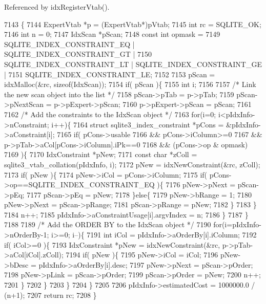 Referenced by idx\+Register\+Vtab().


\begin{DoxyCode}
7143                                                                              \{
7144   ExpertVtab *p = (ExpertVtab*)pVtab;
7145   \textcolor{keywordtype}{int} rc = SQLITE_OK;
7146   \textcolor{keywordtype}{int} n = 0;
7147   IdxScan *pScan;
7148   \textcolor{keyword}{const} \textcolor{keywordtype}{int} opmask = 
7149     SQLITE_INDEX_CONSTRAINT_EQ | SQLITE_INDEX_CONSTRAINT_GT |
7150     SQLITE_INDEX_CONSTRAINT_LT | SQLITE_INDEX_CONSTRAINT_GE |
7151     SQLITE_INDEX_CONSTRAINT_LE;
7152 
7153   pScan = idxMalloc(&rc, \textcolor{keyword}{sizeof}(IdxScan));
7154   \textcolor{keywordflow}{if}( pScan )\{
7155     \textcolor{keywordtype}{int} i;
7156 
7157     \textcolor{comment}{/* Link the new scan object into the list */}
7158     pScan->pTab = p->pTab;
7159     pScan->pNextScan = p->pExpert->pScan;
7160     p->pExpert->pScan = pScan;
7161 
7162     \textcolor{comment}{/* Add the constraints to the IdxScan object */}
7163     \textcolor{keywordflow}{for}(i=0; i<pIdxInfo->nConstraint; i++)\{
7164       \textcolor{keyword}{struct }sqlite3\_index\_constraint *pCons = &pIdxInfo->aConstraint[i];
7165       \textcolor{keywordflow}{if}( pCons->usable 
7166        && pCons->iColumn>=0 
7167        && p->pTab->aCol[pCons->iColumn].iPk==0
7168        && (pCons->op & opmask) 
7169       )\{
7170         IdxConstraint *pNew;
7171         \textcolor{keyword}{const} \textcolor{keywordtype}{char} *zColl = sqlite3_vtab_collation(pIdxInfo, i);
7172         pNew = idxNewConstraint(&rc, zColl);
7173         \textcolor{keywordflow}{if}( pNew )\{
7174           pNew->iCol = pCons->iColumn;
7175           \textcolor{keywordflow}{if}( pCons->op==SQLITE_INDEX_CONSTRAINT_EQ )\{
7176             pNew->pNext = pScan->pEq;
7177             pScan->pEq = pNew;
7178           \}\textcolor{keywordflow}{else}\{
7179             pNew->bRange = 1;
7180             pNew->pNext = pScan->pRange;
7181             pScan->pRange = pNew;
7182           \}
7183         \}
7184         n++;
7185         pIdxInfo->aConstraintUsage[i].argvIndex = n;
7186       \}
7187     \}
7188 
7189     \textcolor{comment}{/* Add the ORDER BY to the IdxScan object */}
7190     \textcolor{keywordflow}{for}(i=pIdxInfo->nOrderBy-1; i>=0; i--)\{
7191       \textcolor{keywordtype}{int} iCol = pIdxInfo->aOrderBy[i].iColumn;
7192       \textcolor{keywordflow}{if}( iCol>=0 )\{
7193         IdxConstraint *pNew = idxNewConstraint(&rc, p->pTab->aCol[iCol].zColl);
7194         \textcolor{keywordflow}{if}( pNew )\{
7195           pNew->iCol = iCol;
7196           pNew->bDesc = pIdxInfo->aOrderBy[i].desc;
7197           pNew->pNext = pScan->pOrder;
7198           pNew->pLink = pScan->pOrder;
7199           pScan->pOrder = pNew;
7200           n++;
7201         \}
7202       \}
7203     \}
7204   \}
7205 
7206   pIdxInfo->estimatedCost = 1000000.0 / (n+1);
7207   \textcolor{keywordflow}{return} rc;
7208 \}
\end{DoxyCode}
\mbox{\label{shell_8c_a794fae5ac4fe40a87cbfe62f946a0e58}} 
